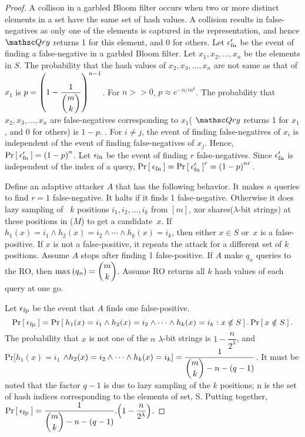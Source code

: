 \begin{proof}%
A collison in a garbled Bloom filter occurs when two or more distinct elements in a set have the same set of hash values. A collision results in false-negatives as only one of the elements is captured in the representation, and hence $\Qry$ returns 1 for this element, and 0 for others. Let $\epsilon_{\mathrm{fn}}'$ be the event of finding a false-negative in a garbled Bloom filter.  Let $x_1,x_2,\ldots,x_n$ be the elements in $S$. The probability that the hash values of $x_2,x_3,\ldots,x_n$ are not same as that of $x_1$ is $p = \left( 1-\dfrac{1}{\dbinom{m}{k}} \right)^{n-1}$. For $n >> 0$, $p \approx  e^{-n/m^k}$. The probability that $x_2,x_3,\ldots,x_n$ are false-negatives corresponding to $x_1$( $\Qry$ returns 1 for $x_1$, and 0 for others) is $1-p$. %
. For $i \neq j$, the event of finding false-negatives of $x_i$ is independent of the event of finding false-negatives of $x_j$. Hence, $\Pr\left[\: \epsilon_{\mathrm{fn}}' \:\right] = \left( 1-p \right)^n$. Let $\epsilon_{\mathrm{fn}}$ be the event of finding $r$ false-negatives. Since $\epsilon_{\mathrm{fn}}'$ is independent of the index of a query, $\Pr\left[\: \epsilon_{\mathrm{fn}} \:\right] = \Pr\left[\: \epsilon_{\mathrm{fn}}' \:\right]^{r} = \left( 1-p \right)^{nr}$.

Define an adaptive attacker $A$ that has the following behavior. It makes $n$ queries to find $r=1$ false-negative. It halts if it finds 1 false-negative. Otherwise it does lazy sampling of ~$k$ positions $i_1,i_2,\ldots,i_k$ from $[m]$, xor shares($\lambda$-bit strings) at these positions in ($M$) to get a candidate~$x$.  If $h_{1}(x)=i_1 \wedge h_2(x)=i_2 \wedge \cdots \wedge h_k(x) = i_k$, then either $x \in S$ or~$x$ is a false-positive. If $x$ is not a false-positive, it repeats the attack for a different set of $k$ positions. Assume $A$ stops after finding 1 false-positive. If $A$ make $q_n$ queries to the RO, then $\max\left(q_n\right) = \dbinom{m}{k}$. Assume RO returns all $k$ hash values of each query at one go.

Let $\epsilon_{\mathrm{fp}}$ be the event that $A$ finds one false-positive. 
 $$\Pr\left[\: \epsilon_{\mathrm{fp}} \:\right] = \Pr\left[\: h_{1}(x)=i_1 \wedge h_2(x)=i_2 \wedge \cdots \wedge h_k(x) = i_k : x \notin S \:\right].\Pr\left[\: x \notin S \:\right].$$
 The probability that $x$ is not one of the $n$ $\lambda$-bit strings is $1-\dfrac{n}{2^\lambda}$, and $ \mathrm{Pr}[h_{1}(x)=i_1$ $\wedge h_2(x)=i_2 \wedge \cdots \wedge h_k(x) = i_k] = \dfrac{1}{\dbinom{m}{k}-n-(q-1)}$. It must be noted that the factor $q-1$ is due to lazy sampling of the $k$ positions; n is the set of hash indices corresponding to the elements of set, S. Putting together, $\Pr\left[\: \epsilon_{\mathrm{fp}} \:\right] =  \dfrac{1}{\dbinom{m}{k}-n-(q-1)} . \Big(1-\dfrac{n}{2^\lambda}\Big)$. 


\end{proof}
